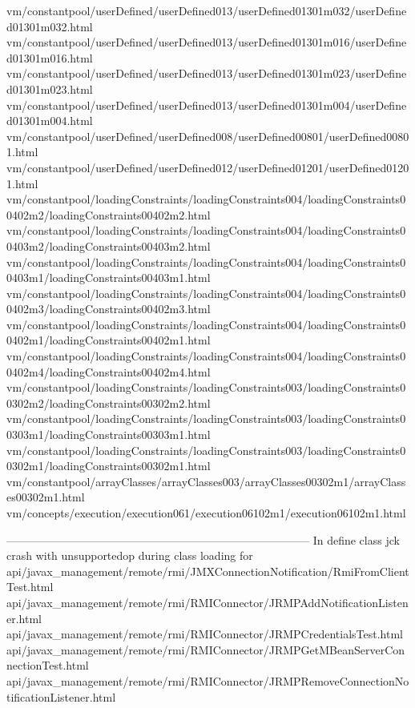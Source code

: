 vm/constantpool/userDefined/userDefined013/userDefined01301m032/userDefined01301m032.html
vm/constantpool/userDefined/userDefined013/userDefined01301m016/userDefined01301m016.html
vm/constantpool/userDefined/userDefined013/userDefined01301m023/userDefined01301m023.html
vm/constantpool/userDefined/userDefined013/userDefined01301m004/userDefined01301m004.html
vm/constantpool/userDefined/userDefined008/userDefined00801/userDefined00801.html
vm/constantpool/userDefined/userDefined012/userDefined01201/userDefined01201.html
vm/constantpool/loadingConstraints/loadingConstraints004/loadingConstraints00402m2/loadingConstraints00402m2.html
vm/constantpool/loadingConstraints/loadingConstraints004/loadingConstraints00403m2/loadingConstraints00403m2.html
vm/constantpool/loadingConstraints/loadingConstraints004/loadingConstraints00403m1/loadingConstraints00403m1.html
vm/constantpool/loadingConstraints/loadingConstraints004/loadingConstraints00402m3/loadingConstraints00402m3.html
vm/constantpool/loadingConstraints/loadingConstraints004/loadingConstraints00402m1/loadingConstraints00402m1.html
vm/constantpool/loadingConstraints/loadingConstraints004/loadingConstraints00402m4/loadingConstraints00402m4.html
vm/constantpool/loadingConstraints/loadingConstraints003/loadingConstraints00302m2/loadingConstraints00302m2.html
vm/constantpool/loadingConstraints/loadingConstraints003/loadingConstraints00303m1/loadingConstraints00303m1.html
vm/constantpool/loadingConstraints/loadingConstraints003/loadingConstraints00302m1/loadingConstraints00302m1.html
vm/constantpool/arrayClasses/arrayClasses003/arrayClasses00302m1/arrayClasses00302m1.html
vm/concepts/execution/execution061/execution06102m1/execution06102m1.html




---------------------------------------------------------------------------------
In define class jck crash with unsupportedop during class loading for
api/javax_management/remote/rmi/JMXConnectionNotification/RmiFromClientTest.html
api/javax_management/remote/rmi/RMIConnector/JRMPAddNotificationListener.html
api/javax_management/remote/rmi/RMIConnector/JRMPCredentialsTest.html
api/javax_management/remote/rmi/RMIConnector/JRMPGetMBeanServerConnectionTest.html
api/javax_management/remote/rmi/RMIConnector/JRMPRemoveConnectionNotificationListener.html